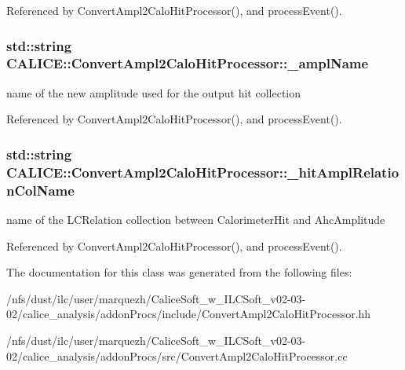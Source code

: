 Referenced by Convert\-Ampl2\-Calo\-Hit\-Processor(), and process\-Event().

\subsubsection[{\-\_\-ampl\-Name}]{\setlength{\rightskip}{0pt plus 5cm}std\-::string C\-A\-L\-I\-C\-E\-::\-Convert\-Ampl2\-Calo\-Hit\-Processor\-::\-\_\-ampl\-Name\hspace{0.3cm}{\ttfamily [protected]}}\label{classCALICE_1_1ConvertAmpl2CaloHitProcessor_a1cf4049cb77b69803d3826cc9d6fa9a7}
name of the new amplitude used for the output hit collection 

Referenced by Convert\-Ampl2\-Calo\-Hit\-Processor(), and process\-Event().

\subsubsection[{\-\_\-hit\-Ampl\-Relation\-Col\-Name}]{\setlength{\rightskip}{0pt plus 5cm}std\-::string C\-A\-L\-I\-C\-E\-::\-Convert\-Ampl2\-Calo\-Hit\-Processor\-::\-\_\-hit\-Ampl\-Relation\-Col\-Name\hspace{0.3cm}{\ttfamily [protected]}}\label{classCALICE_1_1ConvertAmpl2CaloHitProcessor_ad89c705437cb9ed98577893592e5d63a}
name of the L\-C\-Relation collection between Calorimeter\-Hit and Ahc\-Amplitude 

Referenced by Convert\-Ampl2\-Calo\-Hit\-Processor(), and process\-Event().



The documentation for this class was generated from the following files\-:\begin{DoxyCompactItemize}
\item 
/nfs/dust/ilc/user/marquezh/\-Calice\-Soft\-\_\-w\-\_\-\-I\-L\-C\-Soft\-\_\-v02-\/03-\/02/calice\-\_\-analysis/addon\-Procs/include/Convert\-Ampl2\-Calo\-Hit\-Processor.\-hh\item 
/nfs/dust/ilc/user/marquezh/\-Calice\-Soft\-\_\-w\-\_\-\-I\-L\-C\-Soft\-\_\-v02-\/03-\/02/calice\-\_\-analysis/addon\-Procs/src/Convert\-Ampl2\-Calo\-Hit\-Processor.\-cc\end{DoxyCompactItemize}
